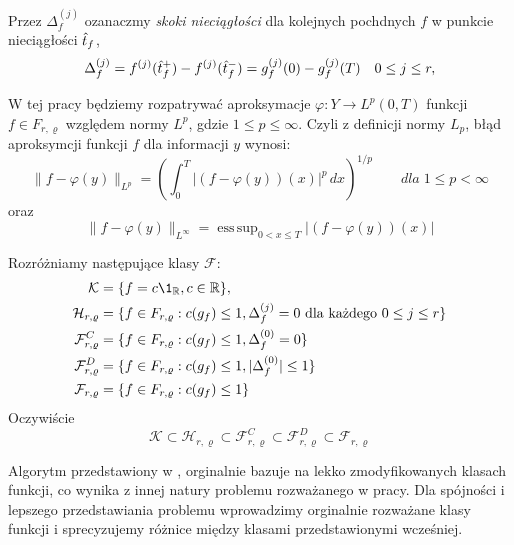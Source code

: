 \documentclass[oik, pdftex, robocza, man]{mgrwms}
\DeclareMathOperator*{\esssup}{ess\,sup}
\begin{document}
    Przez $\Delta_f^{(j)}$ ozanaczmy \emph{skoki nieciągłości} dla kolejnych pochdnych $f$ w punkcie nieciągłości $\hat{t}_f$,
    \begin{equation*}
        \Delta_f^{(j)} = f^{(j)}(\hat{t}_f^+) - f^{(j)}(\hat{t}_f^-) = g_f^{(j)}(0) - g_f^{(j)}(T) \quad 0 \leq j \leq r,
    \end{equation*}

    W tej pracy będziemy rozpatrywać aproksymacje $\varphi : Y \rightarrow L^p(0, T)$ funkcji $f \in F_{r, \varrho}$ względem normy $L^p$, gdzie $1 \leq p \leq \infty$. Czyli z definicji normy $L_{p}$, błąd aproksymcji funkcji $f$ dla informacji $y$ wynosi:
    \begin{equation*}
        \|f-\varphi(y)\|_{L^p} = \left( \int_{0}^{T} |(f-\varphi(y))(x)|^p \,dx  \right)^{1/p} \qquad dla \; 1 \leq p < \infty
    \end{equation*}
    oraz
    \begin{equation*}
        \|f-\varphi(y)\|_{L^\infty} = \esssup_{0 < x \leq T} | (f - \varphi(y))(x) |
    \end{equation*}

    Rozróżniamy następujące klasy $\mathcal{F}$:
    \begin{equation*}
        \begin{split}
            \mathcal{K} & = \{f = c \1_{\R}, c \in \R \}, \\
            \mathcal{H}_{r, \varrho} & = \{ f \in F_{r, \varrho}: c(g_{f}) \leq 1, \Delta_{f}^{(j)} = 0 \text{ dla każdego } 0 \leq j \leq r\} \\
            \mathcal{F}_{r, \varrho}^{C} & = \{ f \in F_{r, \varrho}: c(g_{f}) \leq 1, \Delta_{f}^{(0)} = 0 \} \\
            \mathcal{F}_{r, \varrho}^{D} & = \{ f \in F_{r, \varrho}: c(g_{f}) \leq 1, | \Delta_{f}^{(0)} | \leq 1 \} \\
            \mathcal{F}_{r, \varrho} & = \{ f \in F_{r, \varrho}: c(g_{f}) \leq 1 \} \\
        \end{split}
    \end{equation*}
    Oczywiście
    \begin{equation*}
        \mathcal{K} \subset \mathcal{H}_{r, \varrho} \subset \mathcal{F}_{r, \varrho}^{C} \subset \mathcal{F}_{r, \varrho}^{D} \subset \mathcal{F}_{r, \varrho}
    \end{equation*}


    Algorytm przedstawiony w  \cite{CoDF}, orginalnie bazuje na lekko zmodyfikowanych klasach funkcji, co wynika z innej natury problemu rozważanego w pracy. Dla spójności i lepszego przedstawiania problemu wprowadzimy orginalnie rozważane klasy funkcji i sprecyzujemy różnice między klasami przedstawionymi wcześniej.
\end{document}
